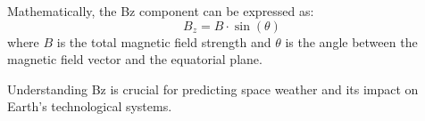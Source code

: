 Mathematically, the Bz component can be expressed as:
\[
B_z = B \cdot \sin(\theta)
\]
where \( B \) is the total magnetic field strength and \( \theta \) is the angle between the magnetic field vector and the equatorial plane.

Understanding Bz is crucial for predicting space weather and its impact on Earth's technological systems.

